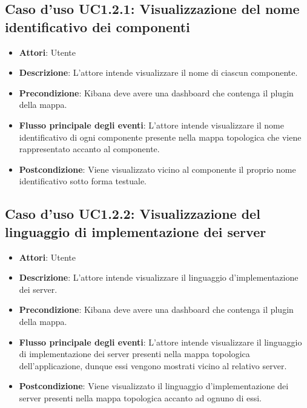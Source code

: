 \subsection{Caso d'uso UC1.2.1: Visualizzazione del nome identificativo dei componenti}
\begin{itemize}
	\item \textbf{Attori}: Utente
	\item \textbf{Descrizione}: L'attore intende visualizzare il nome di ciascun componente.
	\item \textbf{Precondizione}: Kibana deve avere una dashboard che contenga il plugin della mappa.
	\item \textbf{Flusso principale degli eventi}: L'attore intende visualizzare il nome identificativo di ogni componente presente nella mappa topologica che viene rappresentato accanto al componente.
	\item \textbf{Postcondizione}: Viene visualizzato vicino al componente il proprio nome identificativo sotto forma testuale.
\end{itemize}
\subsection{Caso d'uso UC1.2.2: Visualizzazione del linguaggio di implementazione dei server}
\begin{itemize}
	\item \textbf{Attori}: Utente
	\item \textbf{Descrizione}: L'attore intende visualizzare il linguaggio d'implementazione dei server.
	\item \textbf{Precondizione}: Kibana deve avere una dashboard che contenga il plugin della mappa.
	\item \textbf{Flusso principale degli eventi}: L'attore intende visualizzare il linguaggio di implementazione dei server presenti nella mappa topologica dell'applicazione, dunque essi vengono mostrati vicino al relativo server.
	\item \textbf{Postcondizione}: Viene visualizzato il linguaggio d'implementazione dei server presenti nella mappa topologica accanto ad ognuno di essi.
\end{itemize}

 \hypertarget{UC1.3}{}
